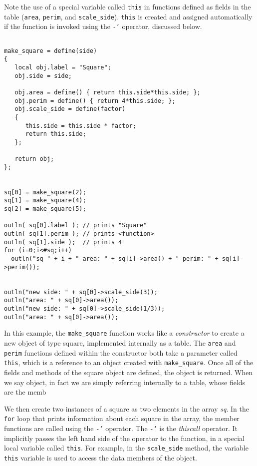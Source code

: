\documentclass{article}
\newcommand\gt{\char`\>}
\begin{document}
Note the use of a special variable called \texttt{this} in functions defined as fields in the table (\texttt{area}, \texttt{perim}, and \texttt{scale\_side}).  \texttt{this} is created and assigned automatically if the function is invoked using the \texttt{-\gt} operator, discussed below.

\begin{verbatim}

make_square = define(side)
{
   local obj.label = "Square";
   obj.side = side;

   obj.area = define() { return this.side*this.side; };  
   obj.perim = define() { return 4*this.side; };
   obj.scale_side = define(factor)
   {
      this.side = this.side * factor;
      return this.side;
   };
   
   return obj;
};


sq[0] = make_square(2);
sq[1] = make_square(4);
sq[2] = make_square(5);

outln( sq[0].label ); // prints "Square"
outln( sq[1].perim ); // prints <function>
outln( sq[1].side );  // prints 4
for (i=0;i<#sq;i++)
  outln("sq " + i + " area: " + sq[i]->area() + " perim: " + sq[i]->perim());


outln("new side: " + sq[0]->scale_side(3));
outln("area: " + sq[0]->area());
outln("new side: " + sq[0]->scale_side(1/3));
outln("area: " + sq[0]->area());
\end{verbatim}

In this example, the \texttt{make\_square} function works like a \emph{constructor} to create a new object of type square, implemented internally as a table.  The \texttt{area} and \texttt{perim} functions defined within the constructor both take a parameter called \texttt{this}, which is a reference to an object created with \texttt{make\_square}.  Once all of the fields and methods of the square object are defined, the object is returned.  When we say object, in fact we are simply referring internally to a table, whose fields are the memb

We then create two instances of a square as two elements in the array \emph{sq}.  In the \texttt{for} loop that prints information about each square in the array, the member functions are called using the \texttt{-\gt} operator.  The \texttt{-\gt} is the \emph{thiscall} operator.  It implicitly passes the left hand side of the operator to the function, in a special local variable called \texttt{this}.  For example, in the \texttt{scale\_side} method, the variable \texttt{this} variable is used to access the data members of the object.
\end{document}

